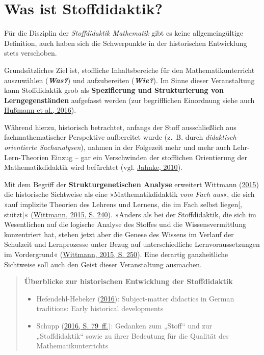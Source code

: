 \documentclass[
]{scrbook}
\providecommand{\tightlist}{%
  \setlength{\itemsep}{0pt}\setlength{\parskip}{0pt}}
\theoremstyle{definition}
\theoremstyle{definition}
\theoremstyle{definition}
\theoremstyle{definition}
\theoremstyle{remark}
\begin{document}
\hypertarget{was-ist-stoffdidaktik}{%
\section*{Was ist Stoffdidaktik?}\label{was-ist-stoffdidaktik}}

Für die Disziplin der \emph{Stoffdidaktik Mathematik} gibt es keine allgemeingültige Definition, auch haben sich die Schwerpunkte in der historischen Entwicklung stets verschoben.

Grundsätzliches Ziel ist, stoffliche Inhaltsbereiche für den Mathematikunterricht auszuwählen (\textbf{\emph{Was?}}) und aufzubereiten (\textbf{\emph{Wie?}}). Im Sinne dieser Veranstaltung kann Stoffdidaktik grob als \textbf{Spezifierung und Strukturierung von Lerngegenständen} aufgefasst werden (zur begrifflichen Einordnung siehe auch \protect\hyperlink{ref-Hussmann:2016a}{Hußmann et al., 2016}).

Während hierzu, historisch betrachtet, anfangs der Stoff ausschließlich aus fachmathematischer Perspektive aufbereitet wurde (z.~B. durch \emph{didaktisch-orientierte Sachanalysen}), nahmen in der Folgezeit mehr und mehr auch Lehr-Lern-Theorien Einzug -- gar ein Verschwinden der stofflichen Orientierung der Mathematikdidaktik wird befürchtet (vgl. \protect\hyperlink{ref-Jahnke:2010}{Jahnke, 2010}).

Mit dem Begriff der \textbf{Strukturgenetischen Analyse} erweitert Wittmann (\protect\hyperlink{ref-Wittmann:2015}{2015}) die historische Sichtweise als eine »Mathematikdidaktik \emph{vom Fach aus}«, die sich »auf implizite Theorien des Lehrens und Lernens, die im Fach selbst liegen{[}, stützt{]}« (\protect\hyperlink{ref-Wittmann:2015}{Wittmann, 2015, S. 240}). »Anders als bei der Stoffdidaktik, die sich im Wesentlichen auf die logische Analyse des Stoffes und die Wissensvermittlung konzentriert hat, stehen jetzt aber die Genese des Wissens im Verlauf der Schulzeit und Lernprozesse unter Bezug auf unterschiedliche Lernvoraussetzungen im Vordergrund« (\protect\hyperlink{ref-Wittmann:2015}{Wittmann, 2015, S. 250}). Eine derartig ganzheitliche Sichtweise soll auch den Geist dieser Veranstaltung ausmachen.

\begin{quote}
\textbf{Überblicke zur historischen Entwicklung der Stoffdidaktik}

\begin{itemize}
\tightlist
\item
  Hefendehl-Hebeker (\protect\hyperlink{ref-Hefendehl-Hebeker:2016}{2016}): Subject-matter didactics in German traditions: Early historical developments
\item
  Schupp (\protect\hyperlink{ref-Schupp:2016}{2016, S. 79~ff.}): Gedanken zum „Stoff`` und zur „Stoffdidaktik`` sowie zu ihrer Bedeutung für die Qualität des Mathematikunterrichts
\end{itemize}
\end{quote}
\end{document}
